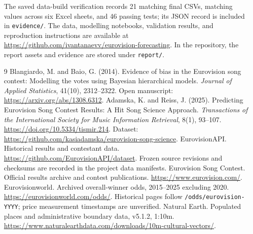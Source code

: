 \documentclass[11pt,a4paper]{article}
\begin{document}
The saved data-build verification records 21 matching final CSVs, matching values across six Excel sheets, and 46 passing tests; its JSON record is included in \texttt{evidence/}. The data, modelling notebooks, validation results, and reproduction instructions are available at \url{https://github.com/ivantanaevv/eurovision-forecasting}. In the repository, the report assets and evidence are stored under \texttt{report/}.

\begingroup
\small
\setlength{\bibsep}{3pt}
\begin{thebibliography}{9}
Blangiardo, M. and Baio, G. (2014). Evidence of bias in the Eurovision song contest: Modelling the votes using Bayesian hierarchical models. \emph{Journal of Applied Statistics}, 41(10), 2312--2322. Open manuscript: \url{https://arxiv.org/abs/1308.6312}.
Adamska, K. and Reiss, J. (2025). Predicting Eurovision Song Contest Results: A Hit Song Science Approach. \emph{Transactions of the International Society for Music Information Retrieval}, 8(1), 93--107. \url{https://doi.org/10.5334/tismir.214}. Dataset: \url{https://github.com/kasiadamska/eurovision-song-science}.
EurovisionAPI. Historical results and contestant data. \url{https://github.com/EurovisionAPI/dataset}. Frozen source revisions and checksums are recorded in the project data manifests.
Eurovision Song Contest. Official results archive and contest publications. \url{https://www.eurovision.com/}.
Eurovisionworld. Archived overall-winner odds, 2015--2025 excluding 2020. \url{https://eurovisionworld.com/odds/}. Historical pages follow \texttt{/odds/eurovision-YYYY}; price measurement timestamps are unverified.
Natural Earth. Populated places and administrative boundary data, v5.1.2, 1:10m. \url{https://www.naturalearthdata.com/downloads/10m-cultural-vectors/}.
\end{thebibliography}
\endgroup
\end{document}
